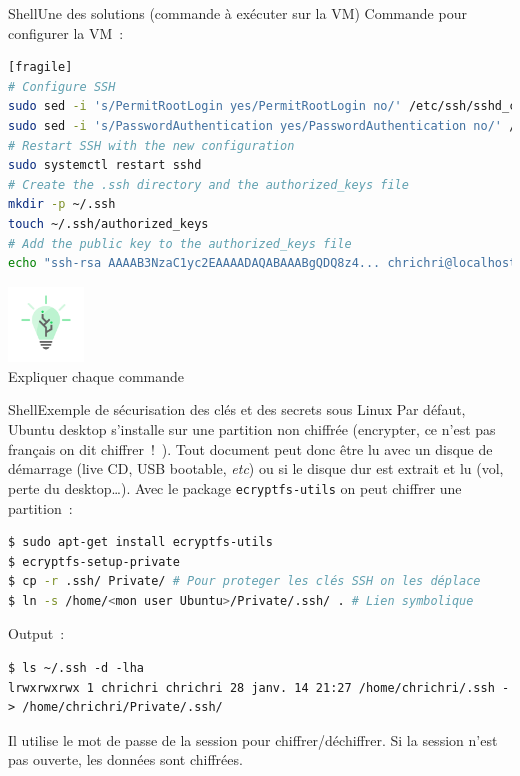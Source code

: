 \documentclass{beamer}
\begin{document}
    \begin{frame}[fragile]{Shell}{Une des solutions (commande à exécuter sur la VM)}
        Commande pour configurer la VM~:
        \begin{lstlisting}[language=bash][fragile]
# Configure SSH
sudo sed -i 's/PermitRootLogin yes/PermitRootLogin no/' /etc/ssh/sshd_config
sudo sed -i 's/PasswordAuthentication yes/PasswordAuthentication no/' /etc/ssh/sshd_config
# Restart SSH with the new configuration
sudo systemctl restart sshd
# Create the .ssh directory and the authorized_keys file
mkdir -p ~/.ssh
touch ~/.ssh/authorized_keys
# Add the public key to the authorized_keys file
echo "ssh-rsa AAAAB3NzaC1yc2EAAAADAQABAAABgQDQ8z4... chrichri@localhost" >> ~/.ssh/authorized_keys
        \end{lstlisting}
        \begin{center}
            \includegraphics[width=2cm]{image/digicomp-lightbulb} \\ Expliquer chaque commande \\
        \end{center}
    \end{frame}

    \begin{frame}[fragile]{Shell}{Exemple de sécurisation des clés et des secrets sous Linux}
        Par défaut, Ubuntu desktop s’installe sur une partition non
        chiffrée (encrypter, ce n’est pas français on dit chiffrer~!~).
        Tout document peut donc être lu avec un disque de
        démarrage (live CD, USB bootable, \textit{etc}) ou si le disque dur
        est extrait et lu (vol, perte du desktop\ldots).
        \bigbreak
        Avec le package \lstinline{ecryptfs-utils} on peut chiffrer une partition~:
        \begin{lstlisting}[language=bash]
$ sudo apt-get install ecryptfs-utils
$ ecryptfs-setup-private
$ cp -r .ssh/ Private/ # Pour proteger les clés SSH on les déplace
$ ln -s /home/<mon user Ubuntu>/Private/.ssh/ . # Lien symbolique
        \end{lstlisting}
        Output~:
        \begin{lstlisting}
$ ls ~/.ssh -d -lha
lrwxrwxrwx 1 chrichri chrichri 28 janv. 14 21:27 /home/chrichri/.ssh -> /home/chrichri/Private/.ssh/
        \end{lstlisting}
        Il utilise le mot de passe de la session pour chiffrer/déchiffrer.
        Si la session n'est pas ouverte, les données sont chiffrées.
    \end{frame}
\end{document}
